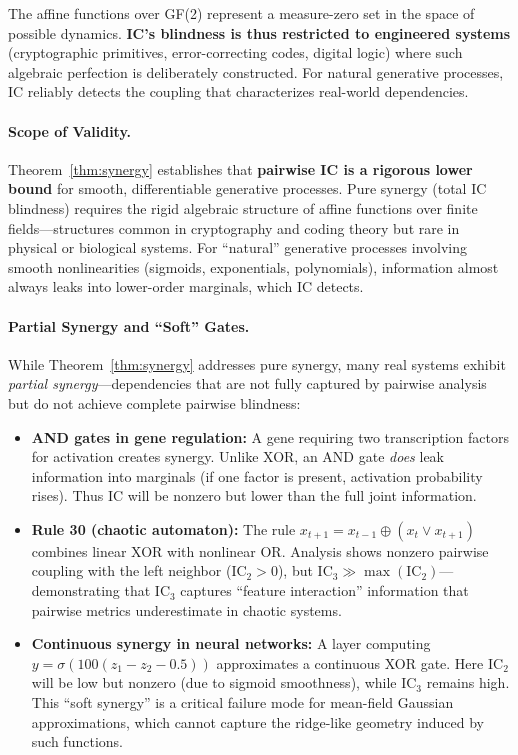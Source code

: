 \documentclass[10pt]{article} %
\theoremstyle{plain}
\theoremstyle{definition}
\newcommand{\IC}{\mathrm{IC}}  %
\begin{document}
\noindent The affine functions over GF(2) represent a measure-zero set in the space of possible dynamics. \textbf{IC's blindness is thus restricted to engineered systems} (cryptographic primitives, error-correcting codes, digital logic) where such algebraic perfection is deliberately constructed. For natural generative processes, IC reliably detects the coupling that characterizes real-world dependencies.

\paragraph{Scope of Validity.} Theorem~\ref{thm:synergy} establishes that \textbf{pairwise IC is a rigorous lower bound} for smooth, differentiable generative processes. Pure synergy (total IC blindness) requires the rigid algebraic structure of affine functions over finite fields---structures common in cryptography and coding theory but rare in physical or biological systems. For ``natural'' generative processes involving smooth nonlinearities (sigmoids, exponentials, polynomials), information almost always leaks into lower-order marginals, which IC detects.

\paragraph{Partial Synergy and ``Soft'' Gates.} While Theorem~\ref{thm:synergy} addresses pure synergy, many real systems exhibit \emph{partial synergy}---dependencies that are not fully captured by pairwise analysis but do not achieve complete pairwise blindness:

\begin{itemize}
    \item \textbf{AND gates in gene regulation:} A gene requiring two transcription factors for activation creates synergy. Unlike XOR, an AND gate \emph{does} leak information into marginals (if one factor is present, activation probability rises). Thus IC will be nonzero but lower than the full joint information.
    
    \item \textbf{Rule 30 (chaotic automaton):} The rule $x_{t+1} = x_{t-1} \oplus (x_t \lor x_{t+1})$ combines linear XOR with nonlinear OR. Analysis shows nonzero pairwise coupling with the left neighbor ($\IC_2 > 0$), but $\IC_3 \gg \max(\IC_2)$---demonstrating that $\IC_3$ captures ``feature interaction'' information that pairwise metrics underestimate in chaotic systems.
    
    \item \textbf{Continuous synergy in neural networks:} A layer computing $y = \sigma(100(z_1 - z_2 - 0.5))$ approximates a continuous XOR gate. Here $\IC_2$ will be low but nonzero (due to sigmoid smoothness), while $\IC_3$ remains high. This ``soft synergy'' is a critical failure mode for mean-field Gaussian approximations, which cannot capture the ridge-like geometry induced by such functions.
\end{itemize}
\end{document}
